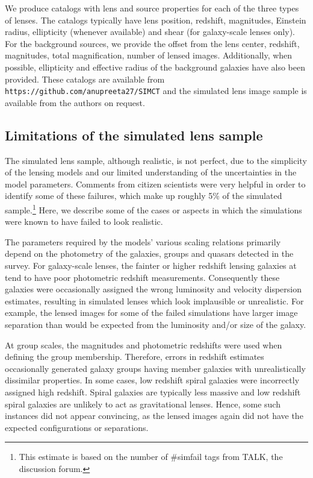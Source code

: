 \documentclass[useAMS,usenatbib,a4paper]{mn2e}
\begin{document}
We produce catalogs with lens and source properties for each of the
three types of lenses.  The catalogs typically have lens position,
redshift, magnitudes, Einstein radius, ellipticity (whenever available)
and shear (for galaxy-scale lenses only). For the background sources, we
provide the offset from the lens center, redshift, magnitudes, total
magnification, number of lensed images. Additionally, when possible,
ellipticity and effective radius of the background galaxies have also
been provided. These catalogs are available from
\texttt{https://github.com/anupreeta27/SIMCT} and the
simulated lens image sample is available from the authors on request.


\subsection{Limitations of the simulated lens sample}

The simulated lens sample, although realistic, is not perfect, due to
the simplicity of the lensing models and our limited understanding of
the uncertainties in the model parameters. Comments from citizen
scientists were very helpful in order to identify some of these failures, which
make up roughly 5\% of the simulated sample.\footnote{This estimate is
based on the number of \#simfail tags from TALK, the discussion forum.}
Here, we describe some of the cases or aspects in which the simulations
were known to have failed to look realistic.

The parameters required by the models' various scaling relations
primarily depend on the photometry of the galaxies, groups and quasars
detected in the survey. For galaxy-scale lenses, the fainter or higher redshift
lensing galaxies at tend to have poor photometric redshift
measurements. Consequently these galaxies were occasionally assigned the wrong
luminosity and velocity dispersion estimates, resulting in
simulated lenses which look implausible or unrealistic.  For example,
the lensed images for some of the failed simulations have larger image
separation than would be expected from the luminosity and/or size of the
galaxy.

At group scales, the magnitudes and photometric redshifts were used when defining
the group membership. Therefore, errors in redshift estimates occasionally
generated galaxy
groups having member galaxies with unrealistically dissimilar properties.
In some cases,
low redshift spiral galaxies were incorrectly assigned high redshift.
Spiral galaxies are typically less massive and low redshift spiral galaxies are
unlikely to act as gravitational lenses. Hence, some such instances
did not appear convincing, as the lensed images again did not have the expected
configurations or separations.
\end{document}
